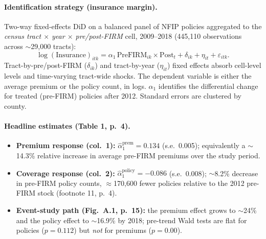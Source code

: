 \documentclass[11pt]{article}
\begin{document}
\paragraph{Identification strategy (insurance margin).}
Two-way fixed-effects DiD on a balanced panel of NFIP policies aggregated to the
\emph{census tract $\times$ year $\times$ pre/post-FIRM} cell, 2009--2018 (445{,}110
observations across $\sim$29{,}000 tracts):
\begin{equation*}
\log(\text{Insurance})_{itk} = \alpha_1 \, \text{PreFIRM}_{ik}\times \text{Post}_t
+ \delta_{ik} + \eta_{it} + \varepsilon_{itk}.
\end{equation*}
Tract-by-pre/post-FIRM ($\delta_{ik}$) and tract-by-year ($\eta_{it}$) fixed effects
absorb cell-level levels and time-varying tract-wide shocks. The dependent variable is
either the average premium or the policy count, in logs. $\alpha_1$ identifies the
differential change for treated (pre-FIRM) policies after 2012. Standard errors are
clustered by county.

\paragraph{Headline estimates (Table 1, p.\ 4).}
\begin{itemize}
\item \textbf{Premium response (col.\ 1):} $\hat{\alpha}_1^{\text{prem}} = 0.134$
(s.e.\ 0.005); equivalently a $\sim$14.3\% relative increase in average pre-FIRM
premiums over the study period.
\item \textbf{Coverage response (col.\ 2):} $\hat{\alpha}_1^{\text{policy}} = -0.086$
(s.e.\ 0.008); $\sim$8.2\% decrease in pre-FIRM policy counts, $\approx$170{,}600
fewer policies relative to the 2012 pre-FIRM stock (footnote 11, p.\ 4).
\item \textbf{Event-study path (Fig.\ A.1, p.\ 15):} the premium effect grows to
$\sim$24\% and the policy effect to $\sim$16.9\% by 2018; pre-trend Wald tests are
flat for policies ($p=0.112$) but \emph{not} for premiums ($p=0.00$).
\end{itemize}
\end{document}
